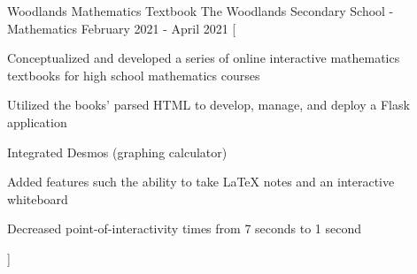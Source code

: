 

\begin{cventries}

  \cventry
    {Woodlands Mathematics Textbook} %
    {The Woodlands Secondary School - Mathematics} %
    {} %
    {February 2021 - April 2021} %
    [
      \begin{cvitems} %
        \item {Conceptualized and developed a series of online interactive mathematics textbooks for high school mathematics courses}
        \item {Utilized the books' parsed HTML to develop, manage, and deploy a Flask application}
        \item {Integrated Desmos (graphing calculator)}
        \item {Added features such the ability to take LaTeX notes and an interactive whiteboard}
        \item {Decreased point-of-interactivity times from 7 seconds to 1 second}
      \end{cvitems}
    ]

\end{cventries}
